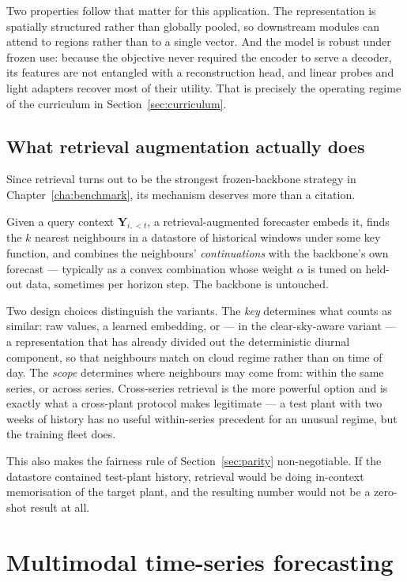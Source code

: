 Two properties follow that matter for this application. The representation is spatially
structured rather than globally pooled, so downstream modules can attend to regions rather
than to a single vector. And the model is robust under frozen use: because the objective never
required the encoder to serve a decoder, its features are not entangled with a reconstruction
head, and linear probes and light adapters recover most of their utility. That is precisely
the operating regime of the curriculum in Section~\ref{sec:curriculum}.

\subsection{What retrieval augmentation actually does}

Since retrieval turns out to be the strongest frozen-backbone strategy in
Chapter~\ref{cha:benchmark}, its mechanism deserves more than a citation.

Given a query context $\mathbf{Y}_{i,<t}$, a retrieval-augmented forecaster embeds it, finds
the $k$ nearest neighbours in a datastore of historical windows under some key function, and
combines the neighbours' \emph{continuations} with the backbone's own forecast --- typically
as a convex combination whose weight $\alpha$ is tuned on held-out data, sometimes per horizon
step. The backbone is untouched.

Two design choices distinguish the variants. The \emph{key} determines what counts as
similar: raw values, a learned embedding, or --- in the clear-sky-aware variant --- a
representation that has already divided out the deterministic diurnal component, so that
neighbours match on cloud regime rather than on time of day. The \emph{scope} determines
where neighbours may come from: within the same series, or across series. Cross-series
retrieval is the more powerful option and is exactly what a cross-plant protocol makes
legitimate --- a test plant with two weeks of history has no useful within-series precedent
for an unusual regime, but the training fleet does.

This also makes the fairness rule of Section~\ref{sec:parity} non-negotiable. If the datastore
contained test-plant history, retrieval would be doing in-context memorisation of the target
plant, and the resulting number would not be a zero-shot result at all.

\section{Multimodal time-series forecasting}
\label{sec:multimodal}

